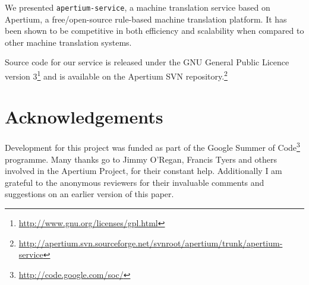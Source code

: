 \documentclass[11pt]{article}
\begin{document}
We presented {\tt\small apertium-service}, a machine translation service based on Apertium, a free/open-source rule-based machine translation platform. It has been shown to be competitive in both efficiency and scalability when compared to other machine translation systems.

Source code for our service is released under the GNU General Public Licence version 3\footnote{\small\url{http://www.gnu.org/licenses/gpl.html}} and is available on the Apertium SVN repository.\footnote{{\small\url{http://apertium.svn.sourceforge.net/svnroot/apertium/trunk/apertium-service}}}

\section*{Acknowledgements}

Development for this project was funded as part of the Google Summer of Code\footnote{\small\url{http://code.google.com/soc/}} programme.
Many thanks go to Jimmy O'Regan, Francis Tyers and others involved in the Apertium Project, for their constant help. Additionally I am grateful to the anonymous reviewers for their invaluable comments and suggestions on an earlier version of this paper.



\end{document}
